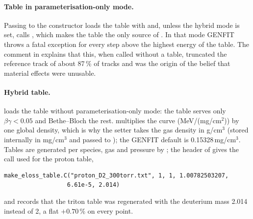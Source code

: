 \paragraph{Table in parameterisation-only mode.} Passing  to the constructor loads the table with
 and, unless the hybrid mode is set, calls , which makes the
table the only source of \dedx{}. In that mode GENFIT throws a fatal exception for every step above the highest
energy of the table. The comment in  explains that this, when called without a table, truncated the
reference track of about 87\,\% of tracks and was the origin of the belief that material effects were unusable.

\paragraph{Hybrid table.}  loads the table without parameterisation-only mode:
the table serves only $\beta\gamma<0.05$ and Bethe--Bloch the rest.  multiplies the curve
(MeV/(mg/cm$^2$)) by one global density, which is why the setter takes the gas density in g/cm$^3$ (stored internally
in mg/cm$^3$ and passed to ); the GENFIT default is 0.15328\,mg/cm$^3$. Tables are generated
per species, gas and pressure by ; the header of  gives the
call used for the proton table,
\begin{verbatim}
make_eloss_table.C("proton_D2_300torr.txt", 1, 1, 1.00782503207,
                  6.61e-5, 2.014)
\end{verbatim}
and  records that the triton table was regenerated with the deuterium mass 2.014 instead of
2, a flat $+0.70$\,\% on every point.

